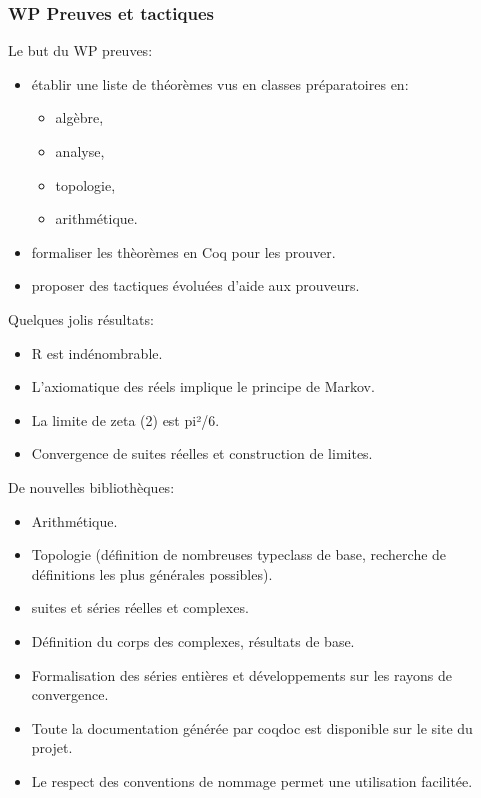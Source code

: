 \begin{frame}
\frametitle{WP Preuves et tactiques} 

Le but du WP preuves:
\begin{itemize}
  \item établir une liste de théorèmes vus en classes préparatoires en: 
  \begin{itemize}
    \item algèbre,
    \item analyse,
    \item topologie,
    \item arithmétique.
  \end{itemize}
  \item formaliser les thèorèmes en Coq pour les prouver.
  \item proposer des tactiques évoluées d'aide aux prouveurs. 
\end{itemize}

\end{frame}


\begin{frame}
 
Quelques jolis résultats:
\begin{itemize}
  \item R est indénombrable.
  \item L'axiomatique des réels implique le principe de Markov.
  \item La limite de zeta (2) est pi²/6.
  \item Convergence de suites réelles et construction de limites.
\end{itemize}
\end{frame}

\begin{frame}
De nouvelles bibliothèques:
\begin{itemize}
  \item Arithmétique.
  \item Topologie (définition de nombreuses typeclass de base, recherche de définitions les plus générales possibles).
  \item suites et séries réelles et complexes.
  \item Définition du corps des complexes, résultats de base.
  \item Formalisation des séries entières et développements sur les rayons de convergence.
\end{itemize}
\end{frame}


\begin{frame}
\begin{itemize}
\item Toute la documentation générée par coqdoc est disponible sur le site du projet. 
\item Le respect des conventions de nommage permet une utilisation facilitée.
\end{itemize}
\end{frame}
